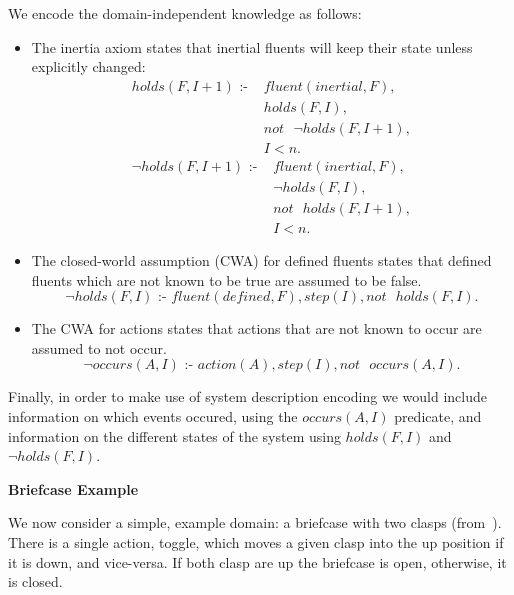 \documentclass[../interim.tex]{subfiles}
\begin{document}
\noindent
We encode the domain-independent knowledge as follows:
\begin{itemize}
  \item The inertia axiom states that inertial fluents will keep their state unless explicitly changed:
  \begin{equation}
    \begin{split}
      holds(F, I+1) \text{ :- } &fluent(inertial, F), \\
      &holds(F, I), \\
      &not \text{ } \neg holds(F, I+1), \\
      &I < n.
    \end{split}
  \end{equation}
  \begin{equation}
    \begin{split}
      \neg holds(F, I+1) \text{ :- } &fluent(inertial, F), \\
      &\neg holds(F, I), \\
      &not \text{ } holds(F, I+1), \\
      &I < n.
    \end{split}
  \end{equation}

  \item The closed-world assumption (CWA) for defined fluents states that defined fluents which are not known to be true are assumed to be false.
  \begin{equation}
    \neg holds(F, I) \text{ :- } fluent(defined, F), step(I), not \text{ } holds(F, I).
  \end{equation}

  \item The CWA for actions states that actions that are not known to occur are assumed to not occur.
  \begin{equation}
    \neg occurs(A, I) \text{ :- } action(A), step(I), not \text{ } occurs(A, I).
  \end{equation}
\end{itemize}

Finally, in order to make use of system description encoding we would include information on which events occured, using the $occurs(A, I)$ predicate, and information on the different states of the system using $holds(F, I)$ and $\neg holds(F, I)$.

\vspace{1cm}
{\large \textbf{Briefcase Example}}

We now consider a simple, example domain: a briefcase with two clasps (from~\cite{krr-asp-book}). There is a single action, toggle, which moves a given clasp into the up position if it is down, and vice-versa. If both clasp are up the briefcase is open, otherwise, it is closed.
\end{document}
